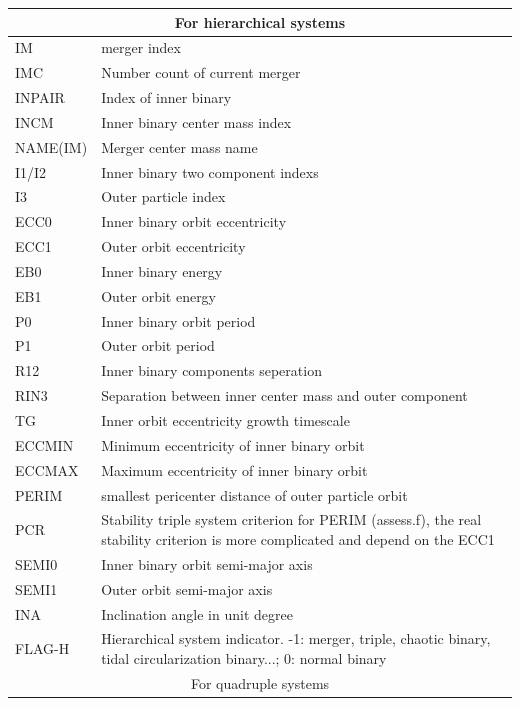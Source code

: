 \begin{longtable}{|p{0.7in}|p{4.3in}|}
    \multicolumn{2}{|c|}{ For hierarchical systems } \\\hline    
    IM     & merger index \\\hline
    IMC    & Number count of current merger \\\hline
    INPAIR & Index of inner binary \\\hline
    INCM   & Inner binary center mass index \\\hline
    NAME(IM) & Merger center mass name \\\hline
    I1/I2  & Inner binary two component indexs \\\hline
    I3     & Outer particle index \\\hline
    ECC0   & Inner binary orbit eccentricity \\\hline
    ECC1   & Outer orbit eccentricity \\\hline
    EB0    & Inner binary energy \\\hline
    EB1    & Outer orbit energy \\\hline
    P0     & Inner binary orbit period \\\hline
    P1     & Outer orbit period \\\hline
    R12    & Inner binary components seperation \\\hline
    RIN3   & Separation between inner center mass and outer component \\\hline
    TG     & Inner orbit eccentricity growth timescale \\\hline
    ECCMIN & Minimum eccentricity of inner binary orbit\\\hline
    ECCMAX & Maximum eccentricity of inner binary orbit \\\hline
    PERIM  & smallest pericenter distance of outer particle orbit\\\hline
    PCR    & Stability triple system criterion for PERIM  (assess.f), the real stability criterion is more complicated and depend on the ECC1 \\\hline
    SEMI0  & Inner binary orbit semi-major axis \\\hline
    SEMI1  & Outer orbit semi-major axis \\\hline
    INA    & Inclination angle in unit degree \\\hline
    FLAG-H & Hierarchical system indicator. -1: merger, triple, chaotic binary, tidal circularization binary...; 0: normal binary \\\hline
    \multicolumn{2}{|c|}{ For quadruple systems } \\\hline    

\end{longtable}
